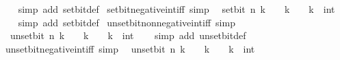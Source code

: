 \begin{isabellebody}
%
\isadelimproof
\ \ %
\endisadelimproof
%
\isatagproof
{}\isamarkupfalse%
\ {\isacharparenleft}{\kern0pt}simp\ add{\isacharcolon}{\kern0pt}\ set{\isacharunderscore}{\kern0pt}bit{\isacharunderscore}{\kern0pt}def{\isacharparenright}{\kern0pt}%
\endisatagproof
{\isafoldproof}%
%
\isadelimproof
\isanewline
%
\endisadelimproof
\isanewline
{}\isamarkupfalse%
\ set{\isacharunderscore}{\kern0pt}bit{\isacharunderscore}{\kern0pt}negative{\isacharunderscore}{\kern0pt}int{\isacharunderscore}{\kern0pt}iff\ {\isacharbrackleft}{\kern0pt}simp{\isacharbrackright}{\kern0pt}{\isacharcolon}{\kern0pt}\isanewline
\ \ {\isacartoucheopen}set{\isacharunderscore}{\kern0pt}bit\ n\ k\ {\isacharless}{\kern0pt}\ {}\ {\isasymlongleftrightarrow}\ k\ {\isacharless}{\kern0pt}\ {}{\isacartoucheclose}\ \ k\ {\isacharcolon}{\kern0pt}{\isacharcolon}{\kern0pt}\ int\isanewline
%
\isadelimproof
\ \ %
\endisadelimproof
%
\isatagproof
{}\isamarkupfalse%
\ {\isacharparenleft}{\kern0pt}simp\ add{\isacharcolon}{\kern0pt}\ set{\isacharunderscore}{\kern0pt}bit{\isacharunderscore}{\kern0pt}def{\isacharparenright}{\kern0pt}%
\endisatagproof
{\isafoldproof}%
%
\isadelimproof
\isanewline
%
\endisadelimproof
\isanewline
{}\isamarkupfalse%
\ unset{\isacharunderscore}{\kern0pt}bit{\isacharunderscore}{\kern0pt}nonnegative{\isacharunderscore}{\kern0pt}int{\isacharunderscore}{\kern0pt}iff\ {\isacharbrackleft}{\kern0pt}simp{\isacharbrackright}{\kern0pt}{\isacharcolon}{\kern0pt}\isanewline
\ \ {\isacartoucheopen}unset{\isacharunderscore}{\kern0pt}bit\ n\ k\ {\isasymge}\ {}\ {\isasymlongleftrightarrow}\ k\ {\isasymge}\ {}{\isacartoucheclose}\ \ k\ {\isacharcolon}{\kern0pt}{\isacharcolon}{\kern0pt}\ int\isanewline
%
\isadelimproof
\ \ %
\endisadelimproof
%
\isatagproof
{}\isamarkupfalse%
\ {\isacharparenleft}{\kern0pt}simp\ add{\isacharcolon}{\kern0pt}\ unset{\isacharunderscore}{\kern0pt}bit{\isacharunderscore}{\kern0pt}def{\isacharparenright}{\kern0pt}%
\endisatagproof
{\isafoldproof}%
%
\isadelimproof
\isanewline
%
\endisadelimproof
\isanewline
{}\isamarkupfalse%
\ unset{\isacharunderscore}{\kern0pt}bit{\isacharunderscore}{\kern0pt}negative{\isacharunderscore}{\kern0pt}int{\isacharunderscore}{\kern0pt}iff\ {\isacharbrackleft}{\kern0pt}simp{\isacharbrackright}{\kern0pt}{\isacharcolon}{\kern0pt}\isanewline
\ \ {\isacartoucheopen}unset{\isacharunderscore}{\kern0pt}bit\ n\ k\ {\isacharless}{\kern0pt}\ {}\ {\isasymlongleftrightarrow}\ k\ {\isacharless}{\kern0pt}\ {}{\isacartoucheclose}\ \ k\ {\isacharcolon}{\kern0pt}{\isacharcolon}{\kern0pt}\ int\isanewline

\end{isabellebody}
